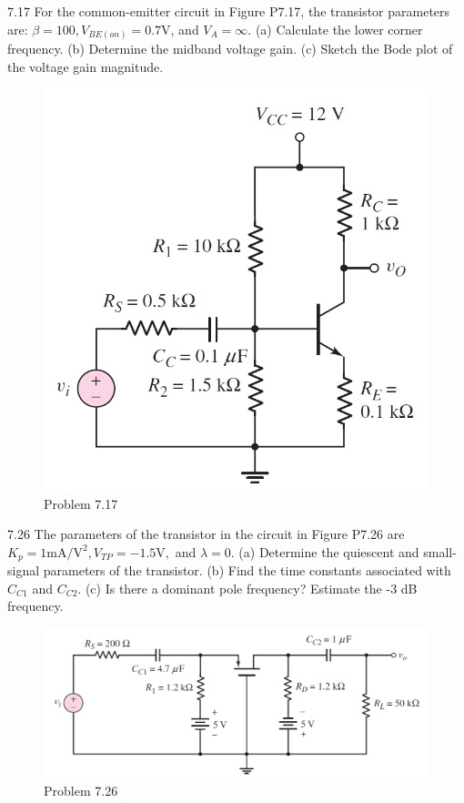 \documentclass[a4paper,11pt,UTF8]{article}
\begin{document}
7.17 For the common-emitter circuit in Figure P7.17, the transistor parameters are: $\beta = 100, V_{BE(on)} = 0.7 $V, and $V_A =\infty$. (a) Calculate the lower corner frequency. (b) Determine the midband voltage gain. (c) Sketch the Bode plot of the voltage gain magnitude.
\begin{figure}[H]
	\centering
	\includegraphics[scale=0.3]{MD7.17}
	\caption{Problem 7.17}
\end{figure}
7.26 The parameters of the transistor in the circuit in Figure P7.26 are $K_p =1 \mathrm{mA/V^2}, V_{TP} = -1.5\mathrm{V},$ and $\lambda=0$. (a) Determine the quiescent and small-signal parameters of the transistor. (b) Find the time constants associated with $C_{C1}$ and $C_{C2}$. (c) Is there a dominant pole frequency? Estimate the -3 dB frequency.
\begin{figure}[H]
	\centering
	\includegraphics[scale=0.3]{MD7.26}
	\caption{Problem 7.26}
\end{figure}
\end{document}
